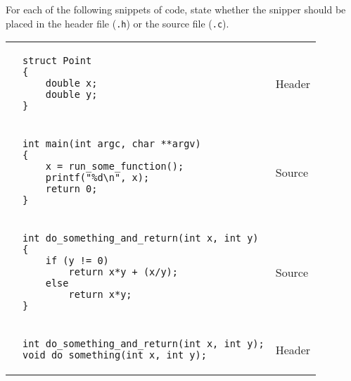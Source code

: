 For each of the following snippets of code, state whether the snipper should be placed in the header file (\texttt{.h}) or the source file (\texttt{.c}).

\begin{enumerate}

\begin{tabular}{p{.25in}p{4.5in} p{2in}}
\item
&
{
\begin{lstlisting}[numbers=none]
struct Point
{
	double x;
	double y;
}
\end{lstlisting}
}
&
\begin{answer}
Header
\end{answer}
\\
\item
&
{
\begin{lstlisting}[numbers=none]
int main(int argc, char **argv)
{
	x = run_some_function();
	printf("%d\n", x);
	return 0;
}
\end{lstlisting}
}
&
\begin{answer}
Source
\end{answer}
\\
\item
&
{
\begin{lstlisting}[numbers=none]
int do_something_and_return(int x, int y)
{
	if (y != 0)
		return x*y + (x/y);
	else
		return x*y;
}
\end{lstlisting}
}
&
\begin{answer}
Source
\end{answer}
\\
\item
&
{
\begin{lstlisting}[numbers=none]
int do_something_and_return(int x, int y);
void do_something(int x, int y);
\end{lstlisting}
}
&
\begin{answer}
Header
\end{answer}
\\
\end{tabular}
\end{enumerate}

